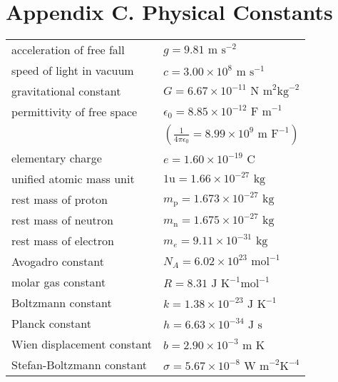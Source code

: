 \section*{Appendix C. Physical Constants}

\vspace*{-2em}
{
{

\begin{longtable}{p{} p{}}
	acceleration of free fall & $g=9.81 \text{ m s}^{-2}$ \\
	speed of light in vacuum & $c = 3.00 \times 10^8 \text{ m s}^{-1}$ \\
	gravitational constant & $G = 6.67 \times 10^{-11} \text{ N m}^2 \text{kg}^{-2}$ \\
	permittivity of free space & $\epsilon_0 = 8.85\times10^{-12} \text{ F m}^{-1}$ \\
	& $\left( \frac{1}{4\pi\epsilon_0} = 8.99\times10^{9} \text{ m F}^{-1} \right)$ \\
	elementary charge & $e = 1.60\times10^{-19} \text{ C}$ \\
	unified atomic mass unit & $1 \text{u} = 1.66\times10^{-27} \text{ kg}$ \\
	rest mass of proton & $m_\text{p} = 1.673 \times 10^{-27} \text{ kg}$ \\
	rest mass of neutron & $m_\text{n} = 1.675 \times 10^{-27} \text{ kg}$ \\
	rest mass of electron & $m_e = 9.11 \times 10^{-31} \text{ kg}$ \\
	Avogadro constant & $N_A = 6.02 \times 10^{23} \text{ mol}^{-1}$ \\
	molar gas constant & $R = 8.31 \text{ J K}^{-1} \text{mol}^{-1}$ \\
	Boltzmann constant & $k = 1.38 \times 10^{-23} \text{ J K}^{-1}$ \\
	Planck constant & $h = 6.63\times10^{-34} \text{ J s}$ \\
	Wien displacement constant & $ b = 2.90 \times 10^{-3} \text{ m K}$ \\
	Stefan-Boltzmann constant & $\sigma = 5.67\times10^{-8} \text{ W m}^{-2}\text{K}^{-4}$\\
\end{longtable} 

}\par}